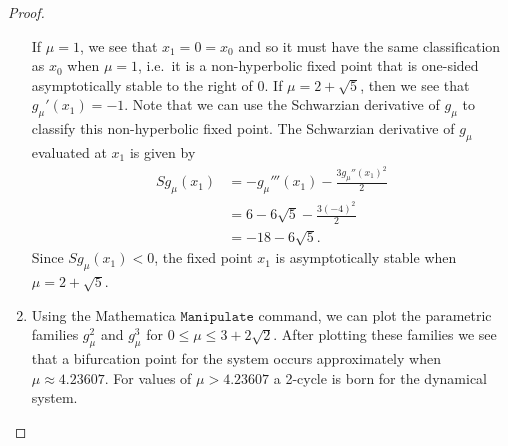 \begin{proof}
\begin{enumerate}
      If $\mu = 1$, we see that $x_1 = 0 = x_0$ and so it must have the same classification as $x_0$ when $\mu = 1$, i.e.\
      it is a non-hyperbolic fixed point that is one-sided asymptotically stable to the right of 0.
      If $\mu = 2 + \sqrt{5}$, then we see that $g_\mu'(x_1) = -1$.
      Note that we can use the Schwarzian derivative of $g_\mu$ to classify this non-hyperbolic fixed point.
      The Schwarzian derivative of $g_\mu$ evaluated at $x_1$ is given by
      \begin{align*}
        Sg_\mu(x_1) &= -g_\mu'''(x_1) - \frac{3g_\mu''(x_1)^2}{2} \\
        &= 6-6\sqrt{5} - \frac{3(-4)^2}{2}\\
        &= -18 - 6\sqrt{5}.
      \end{align*}
      Since $Sg_\mu(x_1) <0$, the fixed point $x_1$ is asymptotically stable
      when $\mu = 2 + \sqrt{5}$.
    \item Using the Mathematica $\texttt{Manipulate}$ command, we can plot the parametric
      families $g_\mu^2$ and $g_\mu^3$ for $0 \leq \mu \leq 3 + 2\sqrt{2}$. After plotting
      these families we see that a bifurcation point for the system occurs approximately
      when $\mu \approx 4.23607$. For values of $\mu > 4.23607$ a 2-cycle is born for
      the dynamical system.
  \end{enumerate}
\end{proof}
\newpage
